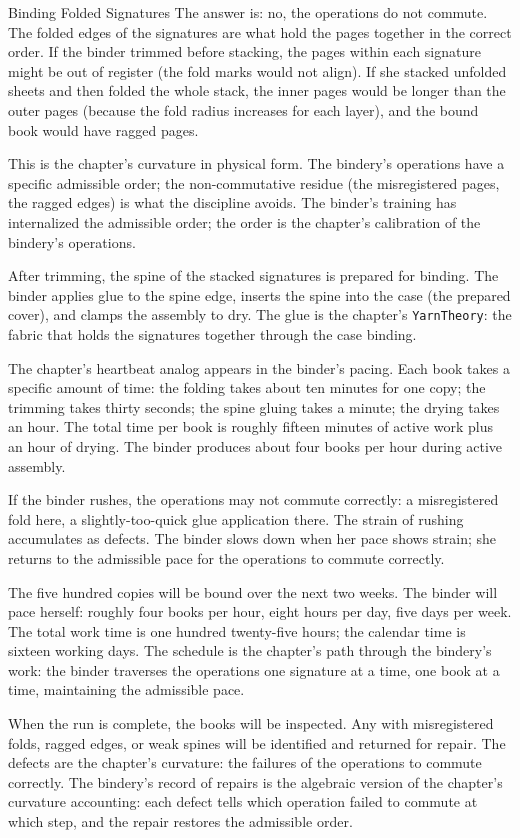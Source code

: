 \begin{coda}{Binding Folded Signatures}
The answer is: no, the operations do not commute. The folded
edges of the signatures are what hold the pages together in the
correct order. If the binder trimmed before stacking, the pages
within each signature might be out of register (the fold marks
would not align). If she stacked unfolded sheets and then folded
the whole stack, the inner pages would be longer than the outer
pages (because the fold radius increases for each layer), and
the bound book would have ragged pages.

This is the chapter's curvature in physical form. The bindery's
operations have a specific admissible order; the non-commutative
residue (the misregistered pages, the ragged edges) is what the
discipline avoids. The binder's training has internalized the
admissible order; the order is the chapter's calibration of
the bindery's operations.

After trimming, the spine of the stacked signatures is prepared
for binding. The binder applies glue to the spine edge,
inserts the spine into the case (the prepared cover), and
clamps the assembly to dry. The glue is the chapter's
\texttt{YarnTheory}: the fabric that holds the signatures
together through the case binding.

The chapter's heartbeat analog appears in the binder's pacing.
Each book takes a specific amount of time: the folding takes
about ten minutes for one copy; the trimming takes thirty
seconds; the spine gluing takes a minute; the drying takes an
hour. The total time per book is roughly fifteen minutes of
active work plus an hour of drying. The binder produces about
four books per hour during active assembly.

If the binder rushes, the operations may not commute correctly:
a misregistered fold here, a slightly-too-quick glue application
there. The strain of rushing accumulates as defects. The binder
slows down when her pace shows strain; she returns to the
admissible pace for the operations to commute correctly.

The five hundred copies will be bound over the next two weeks. The
binder will pace herself: roughly four books per hour, eight hours
per day, five days per week. The total work time is one hundred
twenty-five hours; the calendar time is sixteen working days. The
schedule is the chapter's path through the bindery's work: the
binder traverses the operations one signature at a time, one book
at a time, maintaining the admissible pace.

When the run is complete, the books will be inspected. Any with
misregistered folds, ragged edges, or weak spines will be
identified and returned for repair. The defects are the chapter's
curvature: the failures of the operations to commute correctly.
The bindery's record of repairs is the algebraic version of the
chapter's curvature accounting: each defect tells which operation
failed to commute at which step, and the repair restores the
admissible order.

\end{coda}
